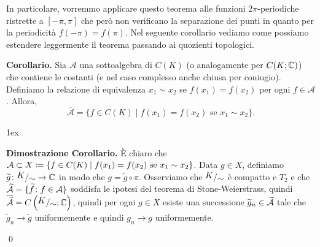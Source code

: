 In particolare, vorremmo applicare questo teorema alle funzioni $2\pi$-periodiche ristrette a $[-\pi, \pi]$ che però non verificano la separazione dei punti in quanto per la periodicità $f(-\pi) = f(\pi)$. Nel seguente corollario vediamo come possiamo estendere leggermente il teorema passando ai quozienti topologici.

\textbf{Corollario.}
Sia $\mathcal A$ una sottoalgebra di $C(K)$ (o analogamente per $C(K; \mathbb C)$) che contiene le costanti (e nel caso complesso anche chiusa per coniugio). Definiamo la relazione di equivalenza $x_1 \sim x_2$ se $f(x_1) = f(x_2)$ per ogni $f \in \mathcal A$. Allora,
$$
	\overline{\mathcal A} = \{ f \in C(K) \mid f(x_1) = f(x_2) \text{ se } x_1 \sim x_2 \}.
$$
\begin{minipage}{\textwidth - 2.5em}
\parskip 1ex
\setlength{\parindent}{0pt}

\begin{wrapfigure}{r}{100pt}
	\centering
	\vspace{-1.5\baselineskip}
	\vspace{-1.5\baselineskip}
\end{wrapfigure}

\textbf{Dimostrazione Corollario.}
È chiaro che $\mathcal{A} \subset X \coloneqq \{ f \in C(K) \mid f(x_1) = f(x_2) \text{ se } x_1 \sim x_2 \}$. Data $g \in X$, definiamo $\tilde{g} \colon \sfrac{K}{\sim} \to \C$ in modo che $g = \tilde{g} \circ \pi$.
Osserviamo che $\sfrac{K}{\sim}$ è compatto e $T_2$ e che $\widetilde{\mathcal{A}} = \{\widetilde{f} \colon  f \in \mathcal{A}\}$ soddisfa le ipotesi del teorema di Stone-Weierstrass, quindi $\ol{\tilde{\mc{A}}} = C\left( \sfrac{K}{\sim} ;\C \right)$, quindi per ogni $g \in X$ esiste una successione $\widetilde{g}_n \in \widetilde{\mathcal{A}}$ tale che $\tilde{g}_n \to \tilde{g}$ uniformemente e quindi $g_n \to g$ uniformemente.

\qed
\end{minipage}

